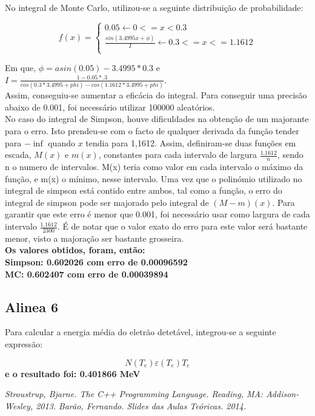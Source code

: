 \documentclass{article}
\begin{document}
\begin{multicols}{2}
  No integral de Monte Carlo, utilizou-se a seguinte distribuição de probabilidade:

  \[
  f(x) =
  \begin{cases}
    0.05 \leftarrow 0 <= x < 0.3\\ 
    \frac{sin(3.4995x + \phi)}{I} \leftarrow 0.3<= x <= 1.1612\\
  \end{cases}\]

  Em que, $\phi = asin(0.05)-3.4995*0.3$ e $I = \frac{1-0.05*.3}{cos(0.3*3.4995+phi)-cos(1.1612*3.4995+phi)}$.\\

  Assim, conseguiu-se aumentar a eficácia do integral. Para conseguir uma precisão abaixo de 0.001, foi necessário utilizar 100000 aleatórios.\\

  No caso do integral de Simpson, houve dificuldades na obtenção de um majorante para o erro. Isto prendeu-se com o facto de qualquer derivada da função tender para $-\inf$ quando $x$ tendia para 1,1612. Assim, definiram-se duas funções em escada, $M(x)$ e $m(x)$, constantes para cada intervalo de largura $\frac{1.1612}{n}$, sendo n o numero de intervalos. M(x) teria como valor em cada intervalo o máximo da função, e m(x) o mínimo, nesse intervalo. Uma vez que o polinómio utilizado no integral de simpson está contido entre ambos, tal como a função, o erro do integral de simpson pode ser majorado pelo integral de $(M-m)(x)$. Para garantir que este erro é menor que 0.001, foi necessário usar como largura de cada intervalo $\frac{1.1612}{2300}$. É de notar que o valor exato do erro para este valor será bastante menor, visto a majoração ser bastante grosseira.\\
\textbf{Os valores obtidos, foram, então:\\
Simpson: 0.602026 com erro de 0.00096592\\
MC: 0.602407 com erro de 0.00039894}\\


  \subsection{Alinea 6}

  Para calcular a energia média do eletrão detetável, integrou-se a seguinte expressão:

\begin{equation}
  N(T_e)\varepsilon (T_e)T_e
\end{equation}
\textbf{e o resultado foi:
0.401866 MeV}


  \begin{thebibliography}{9}


    \textit{Stroustrup, Bjarne. The C++ Programming Language. Reading, MA: Addison-Wesley, 2013.}
    \textit{Barão, Fernando. Slides das Aulas Teóricas. 2014.}

  \end{thebibliography}
\end{multicols}
\end{document}
